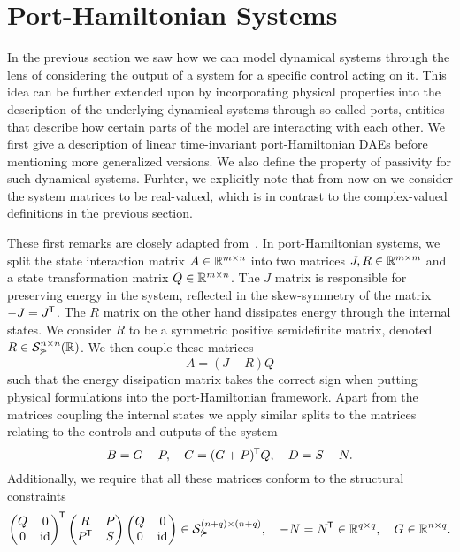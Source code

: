 \section{Port-Hamiltonian Systems}

In the previous section we saw how we can model dynamical systems through the lens of considering the output of a system for a specific control acting on it.
This idea can be further extended upon by incorporating physical properties into the description of the underlying dynamical systems through so-called ports, entities that describe how certain parts of the model are interacting with each other.
We first give a description of linear time-invariant port-Hamiltonian DAEs before mentioning more generalized versions.
We also define the property of passivity for such dynamical systems.
Furhter, we explicitly note that from now on we consider the system matrices to be real-valued, which is in contrast to the complex-valued definitions in the previous section.

These first remarks are closely adapted from~\cite[Definition~4.9]{Mehrmann2022}.
In port-Hamiltonian systems, we split the state interaction matrix $A \in \mathbb{R}^{m \times n}$ into two matrices $J, R \in \mathbb{R}^{m \times m}$ and a state transformation matrix $Q \in \mathbb{R}^{m \times n}$.
The $J$ matrix is responsible for preserving energy in the system, reflected in the skew-symmetry of the matrix $-J = J^{\mkern-1.5mu \mathsf{T}}$.
The $R$ matrix on the other hand dissipates energy through the internal states.
We consider $R$ to be a symmetric positive semidefinite matrix, denoted $R \in \mathcal{S}_{\curlyeqsucc}^{n \times n}(\mathbb{R})$.
We then couple these matrices
\begin{equation*}
    A = (J - R)Q
\end{equation*}
such that the energy dissipation matrix takes the correct sign when putting physical formulations into the port-Hamiltonian framework.
Apart from the matrices coupling the internal states we apply similar splits to the matrices relating to the controls and outputs of the system
\begin{equation*}
    B = G - P,\quad C = (G + P)^{\mkern-1.5mu \mathsf{T}} Q,\quad D = S - N.
\end{equation*}
Additionally, we require that all these matrices conform to the structural constraints
\begin{equation*}
    \begin{pmatrix}
        Q & 0 \\
        0 & \text{id}_{}
    \end{pmatrix}^{\mkern-1.5mu \mathsf{T}}
    \begin{pmatrix}
        R & P \\
        P^{\mkern-1.5mu \mathsf{T}} & S
    \end{pmatrix}
    \begin{pmatrix}
        Q & 0 \\
        0 & \text{id}_{}
    \end{pmatrix}
    \in \mathcal{S}_{\curlyeqsucc}^{(n + q) \times (n + q)},\quad -N = N^{\mkern-1.5mu \mathsf{T}} \in \mathbb{R}^{q \times q},\quad G \in \mathbb{R}^{n \times q}.
\end{equation*}

